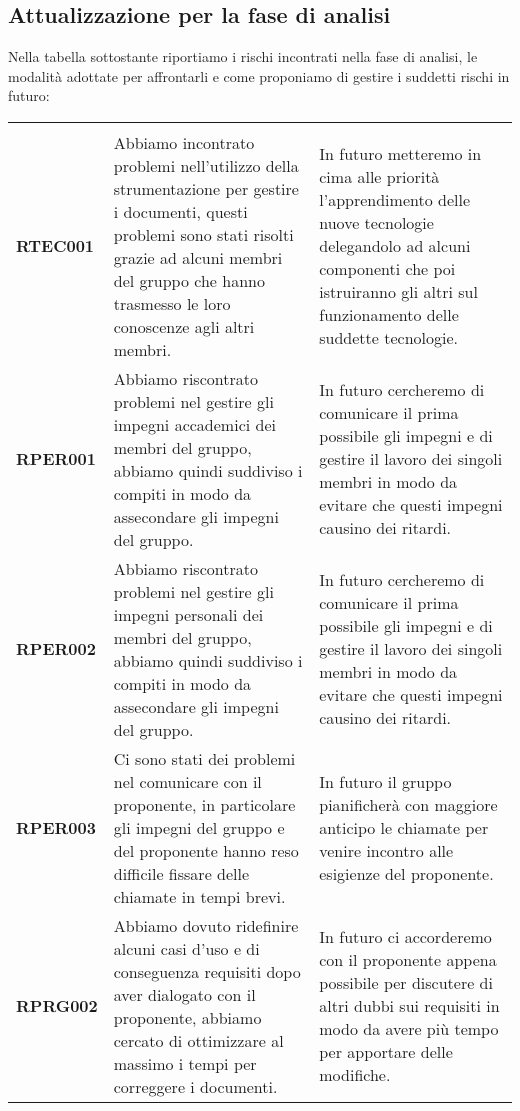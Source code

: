 \documentclass[../piano-di-progetto]{subfiles}
\begin{document}
\subsection{Attualizzazione per la fase di analisi}%
\label{sub:attualizzazione_fase_analisi}
Nella tabella sottostante riportiamo i rischi incontrati nella fase di analisi, le modalità adottate per affrontarli e come proponiamo di gestire i suddetti rischi in futuro:
\begin{table}[H]%
  \label{tab:registro_delle_modifiche}

  \centering

  \begin{longtable}[H]{|p{10em}|p{17em}|p{17em}|}
    \rowcolor{darkgray!90!}\color{white}{\textbf{Rischio}} & \color{white}{\textbf{Gestione}} & \color{white}{\textbf{Monitoraggio}} \\
    \textbf{RTEC001} & Abbiamo incontrato problemi nell'utilizzo della strumentazione per gestire i documenti, questi problemi sono stati risolti grazie ad alcuni membri del gruppo che hanno trasmesso le loro conoscenze agli altri membri. & In futuro metteremo in cima alle priorità l'apprendimento delle nuove tecnologie delegandolo ad alcuni componenti che poi istruiranno gli altri sul funzionamento delle suddette tecnologie.\\
    \textbf{RPER001} & Abbiamo riscontrato problemi nel gestire gli impegni accademici dei membri del gruppo, abbiamo quindi suddiviso i compiti in modo da assecondare gli impegni del gruppo. & In futuro cercheremo di comunicare il prima possibile gli impegni e di gestire il lavoro dei singoli membri in modo da evitare che questi impegni causino dei ritardi.\\
    \textbf{RPER002} & Abbiamo riscontrato problemi nel gestire gli impegni personali dei membri del gruppo, abbiamo quindi suddiviso i compiti in modo da assecondare gli impegni del gruppo. & In futuro cercheremo di comunicare il prima possibile gli impegni e di gestire il lavoro dei singoli membri in modo da evitare che questi impegni causino dei ritardi.\\
    \textbf{RPER003} & Ci sono stati dei problemi nel comunicare con il proponente, in particolare gli impegni del gruppo e del proponente hanno reso difficile fissare delle chiamate in tempi brevi. & In futuro il gruppo pianificherà con maggiore anticipo le chiamate per venire incontro alle esigienze del proponente.\\
    \textbf{RPRG002} & Abbiamo dovuto ridefinire alcuni casi d'uso e di conseguenza requisiti dopo aver dialogato con il proponente, abbiamo cercato di ottimizzare al massimo i tempi per correggere i documenti. & In futuro ci accorderemo con il proponente appena possibile per discutere di altri dubbi sui requisiti in modo da avere più tempo per apportare delle modifiche.\\
    \hline
  \end{longtable}
\end{table}
\end{document}
